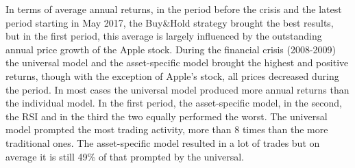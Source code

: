 \documentclass[11pt, a4paper]{article}
\begin{document}
In terms of average annual returns, in the period before the crisis and the latest period starting in May 2017, the Buy\&Hold strategy brought the best results, but in the first period, this average is largely influenced by the outstanding annual price growth of the Apple stock. During the financial crisis (2008-2009) the universal model and the asset-specific model brought the highest and positive returns, though with the exception of Apple's stock, all prices decreased during the period. In most cases the universal model produced more annual returns than the individual model. In the first period, the asset-specific model, in the second, the RSI and in the third the two equally performed the worst. The universal model prompted the most trading activity, more than 8 times than the more traditional ones. The asset-specific model resulted in a lot of trades but on average it is still  49\% of that prompted by the universal. 
\end{document}

